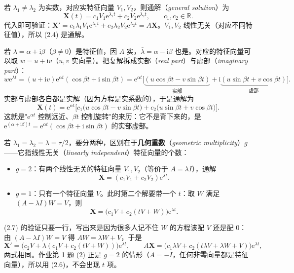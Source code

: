 \documentclass[11pt]{ctexart}
\newcommand{\X}{\mathbf{X}}\newcommand{\Y}{\mathbf{Y}}
\newcommand{\EN}[1]{\textcolor{inkgray}{\itshape #1}}
\begin{document}

若 $\lambda_1\neq\lambda_2$ 为实数，对应实特征向量 $V_1,V_2$，则通解（\EN{general solution}）为
\[
\X(t)=c_1 V_1\mathrm{e}^{\lambda_1 t}+c_2 V_2\mathrm{e}^{\lambda_2 t},
\qquad c_1,c_2\in\mathbb{R}.
\tag{2.4}
\]
代入即可验证：$\X'=c_1\lambda_1V_1\mathrm{e}^{\lambda_1t}+c_2\lambda_2V_2\mathrm{e}^{\lambda_2t}=A\X$。$V_1,V_2$ 线性无关（对应不同特征值），所以 (2.4) 是通解。


若 $\lambda=\alpha+\mathrm{i}\beta$（$\beta\neq0$）是特征值，因 $A$ 实，$\bar\lambda=\alpha-\mathrm{i}\beta$ 也是。对应的特征向量可以取 $w=u+\mathrm{i}v$（$u,v$ 实向量）。把复解拆成实部（\EN{real part}）与虚部（\EN{imaginary part}）：
\[
w\mathrm{e}^{\lambda t}=(u+\mathrm{i}v)\mathrm{e}^{\alpha t}(\cos\beta t+\mathrm{i}\sin\beta t)
=\mathrm{e}^{\alpha t}\Big[\underbrace{(u\cos\beta t-v\sin\beta t)}_{\text{实部}}
+\mathrm{i}\underbrace{(u\sin\beta t+v\cos\beta t)}_{\text{虚部}}\Big].
\]
实部与虚部各自都是实解（因为方程是实系数的），于是通解为
\[
\X(t)=\mathrm{e}^{\alpha t}\Big[c_1\big(u\cos\beta t-v\sin\beta t\big)
+c_2\big(u\sin\beta t+v\cos\beta t\big)\Big].
\tag{2.5}
\]
这就是"$\mathrm{e}^{\alpha t}$ 控制远近、$\beta t$ 控制旋转"的来历：它不是背下来的，是 $\mathrm{e}^{(\alpha+\mathrm{i}\beta)t}=\mathrm{e}^{\alpha t}(\cos\beta t+\mathrm{i}\sin\beta t)$ 的实部虚部。


若 $\lambda_1=\lambda_2=\lambda=\tau/2$，要分两种，区别在于\textbf{几何重数}（\EN{geometric multiplicity}）$g$——它指线性无关（\EN{linearly independent}）特征向量的个数：

\begin{itemize}
\item $g=2$：有两个线性无关的特征向量 $V_1,V_2$（等价于 $A=\lambda I$），通解
\[
\X=(c_1V_1+c_2V_2)\mathrm{e}^{\lambda t}.
\tag{2.6}
\]
\item $g=1$：只有一个特征向量 $V$。此时第二个解要带一个 $t$：取 $W$ 满足 $(A-\lambda I)W=V$，则
\[
\X=\big(c_1V+c_2(tV+W)\big)\mathrm{e}^{\lambda t}.
\tag{2.7}
\]
\end{itemize}

(2.7) 的验证只要一行，写出来是因为很多人记不住 $W$ 的方程该配 $V$ 还是配 $0$：由 $(A-\lambda I)W=V$ 得 $AW=\lambda W+V$，于是
\[
\X'=\big(c_2V+\lambda(c_1V+c_2(tV+W))\big)\mathrm{e}^{\lambda t},\qquad
A\X=\big(c_1\lambda V+c_2(t\lambda V+\lambda W+V)\big)\mathrm{e}^{\lambda t},
\]
两式相同。作业第 1 题 (2) 正是 $g=2$ 的情形（$A=-I$，任何非零向量都是特征向量），所以用 (2.6)，不会出现 $t$ 项。
\end{document}
